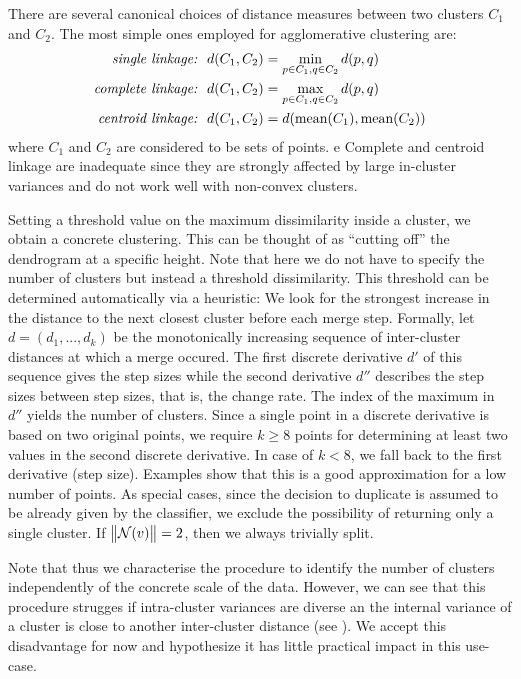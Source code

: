 \documentclass[
	fontsize=10pt, %
	twoside=false, %
	secnumdepth=1, %
  toc=indentunnumbered %
]{kaobook}
\begin{document}
There are several canonical choices of distance measures between two clusters $C_1$ and
$C_2$. The most simple ones employed for agglomerative clustering are:
\begin{align*}
  \text{{\textit{{single linkage:}}}} &~~ d(C_1, C_2) = \min_{p \in C_1, q \in C_2} d(p,q) \\
  \text{{\textit{{complete linkage:}}}} &~~ d(C_1, C_2) = \max_{p \in C_1, q \in C_2} d(p,q) \\
  \text{{\textit{{centroid linkage:}}}} &~~ d(C_1, C_2) = d(\text{mean}(C_1),\text{mean}(C_2))
\end{align*}
where $C_1$ and $C_2$ are considered to be sets of points. e
Complete and centroid linkage are inadequate since they are strongly affected by
large in-cluster variances and do not work well with non-convex clusters.

Setting a threshold value on the maximum dissimilarity inside a cluster, we
obtain a concrete clustering. This can be thought of as ``cutting off'' the
dendrogram at a specific height. Note that here we do not have to specify the
number of clusters but instead a threshold dissimilarity. This threshold can be
determined automatically via a heuristic:
We look for the strongest increase in the distance to the next closest cluster
before each merge step. Formally, let $d = (d_1, ..., d_k)$ be the monotonically
increasing sequence of inter-cluster distances at which a merge occured. The
first discrete derivative $d'$ of this sequence gives the step sizes while the
second derivative $d''$ describes the step sizes between step sizes, that is,
the change rate. The index of the maximum in $d''$ yields the number of
clusters. Since a single point in a discrete derivative is based on two original
points, we require $k \geq 8$ points for determining at least two
values in the second discrete derivative. In case of $k < 8$, we fall back to
the first derivative (step size). Examples show that this is a good
approximation for a low number of points.
%
As special cases, since the decision to duplicate is assumed to be already given
by the classifier, we exclude the possibility of returning only a single
cluster. If~$\norm{\mathcal{N}(v)}=2$, then we always trivially split. 

Note that thus we characterise the procedure to identify the number of clusters
independently of the concrete scale of the data. However,
we can see that this procedure strugges if
intra-cluster variances are diverse an the internal variance of a
cluster is close to another inter-cluster distance (see ).
We accept this disadvantage
for now and hypothesize it has little practical impact in this use-case.
\end{document}
